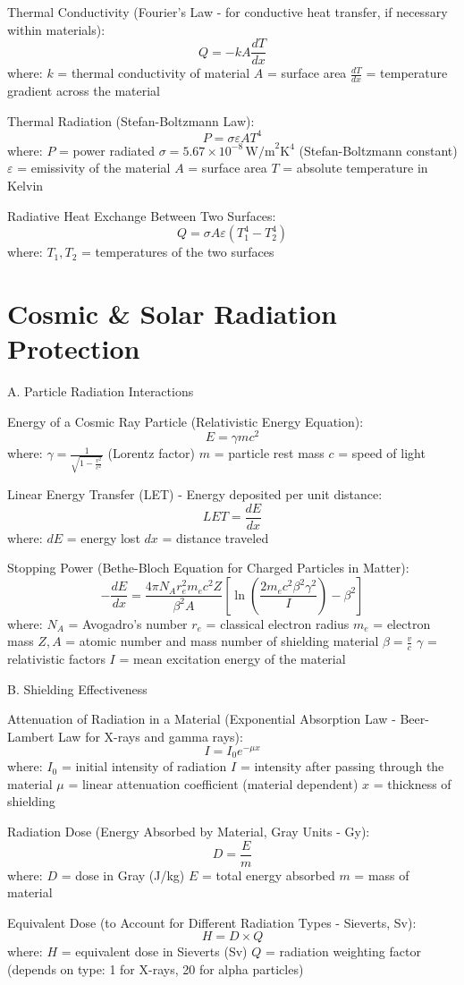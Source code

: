\documentclass{article}
\begin{document}
Thermal Conductivity (Fourier’s Law - for conductive heat transfer, if necessary within materials):
\[
Q = -k A \frac{dT}{dx}
\]
where:  
\( k \) = thermal conductivity of material  
\( A \) = surface area  
\( \frac{dT}{dx} \) = temperature gradient across the material

Thermal Radiation (Stefan-Boltzmann Law):
\[
P = \sigma \varepsilon A T^4
\]
where:  
\( P \) = power radiated  
\( \sigma = 5.67 \times 10^{-8} \, \text{W/m}^2 \text{K}^4 \) (Stefan-Boltzmann constant)  
\( \varepsilon \) = emissivity of the material  
\( A \) = surface area  
\( T \) = absolute temperature in Kelvin

Radiative Heat Exchange Between Two Surfaces:
\[
Q = \sigma A \varepsilon \left(T_1^4 - T_2^4\right)
\]
where:  
\( T_1, T_2 \) = temperatures of the two surfaces

\section{Cosmic \& Solar Radiation Protection}

A. Particle Radiation Interactions

Energy of a Cosmic Ray Particle (Relativistic Energy Equation):
\[
E = \gamma m c^2
\]
where:  
\( \gamma = \frac{1}{\sqrt{1 - \frac{v^2}{c^2}}} \) (Lorentz factor)  
\( m \) = particle rest mass  
\( c \) = speed of light

Linear Energy Transfer (LET) - Energy deposited per unit distance:
\[
LET = \frac{dE}{dx}
\]
where:  
\( dE \) = energy lost  
\( dx \) = distance traveled

Stopping Power (Bethe-Bloch Equation for Charged Particles in Matter):
\[
-\frac{dE}{dx} = \frac{4\pi N_A r_e^2 m_e c^2 Z}{\beta^2 A} \left[ \ln \left( \frac{2m_e c^2 \beta^2 \gamma^2}{I} \right) - \beta^2 \right]
\]
where:  
\( N_A \) = Avogadro’s number  
\( r_e \) = classical electron radius  
\( m_e \) = electron mass  
\( Z, A \) = atomic number and mass number of shielding material  
\( \beta = \frac{v}{c} \)  
\( \gamma \) = relativistic factors  
\( I \) = mean excitation energy of the material

B. Shielding Effectiveness

Attenuation of Radiation in a Material (Exponential Absorption Law - Beer-Lambert Law for X-rays and gamma rays):
\[
I = I_0 e^{-\mu x}
\]
where:  
\( I_0 \) = initial intensity of radiation  
\( I \) = intensity after passing through the material  
\( \mu \) = linear attenuation coefficient (material dependent)  
\( x \) = thickness of shielding

Radiation Dose (Energy Absorbed by Material, Gray Units - Gy):
\[
D = \frac{E}{m}
\]
where:  
\( D \) = dose in Gray (J/kg)  
\( E \) = total energy absorbed  
\( m \) = mass of material

Equivalent Dose (to Account for Different Radiation Types - Sieverts, Sv):
\[
H = D \times Q
\]
where:  
\( H \) = equivalent dose in Sieverts (Sv)  
\( Q \) = radiation weighting factor (depends on type: 1 for X-rays, 20 for alpha particles)
\end{document}
